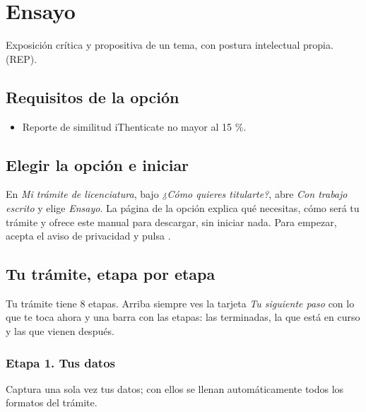\section{Ensayo}
Exposición crítica y propositiva de un tema, con postura intelectual propia. (REP).

\subsection{Requisitos de la opción}
\begin{itemize}
  \item Reporte de similitud iThenticate no mayor al 15 \%.
\end{itemize}
\subsection{Elegir la opción e iniciar}
En \emph{Mi trámite de licenciatura}, bajo \emph{¿Cómo quieres titularte?}, abre \emph{Con trabajo escrito} y elige \emph{Ensayo}. La página de la opción explica qué necesitas, cómo será tu trámite y ofrece este manual para descargar, sin iniciar nada. Para empezar, acepta el aviso de privacidad y pulsa .
\subsection{Tu trámite, etapa por etapa}
Tu trámite tiene 8 etapas. Arriba siempre ves la tarjeta \emph{Tu siguiente paso} con lo que te toca ahora y una barra con las etapas: las terminadas, la que está en curso y las que vienen después.
\subsubsection*{Etapa 1. Tus datos}
Captura una sola vez tus datos; con ellos se llenan automáticamente todos los formatos del trámite.

